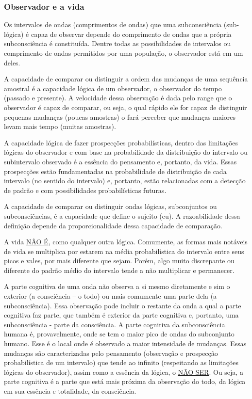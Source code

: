 \subsubsection{Observador e a vida}
Os intervalos de ondas (comprimentos de ondas) que uma subconsciência (sub-lógica) é capaz de observar depende do comprimento de ondas que a própria subconsciência é constituída. Dentre todas as possibilidades de intervalos ou comprimento de ondas permitidos por uma população, o observador está em um deles.

A capacidade de comparar ou distinguir a ordem das mudanças de uma sequência amostral é a capacidade lógica de um observador, o observador do tempo (passado e presente). A velocidade dessa observação é dada pelo range que o observador é capaz de comparar, ou seja, o qual rápido ele for capaz de distinguir pequenas mudanças (poucas amostras) o fará perceber que mudanças maiores levam mais tempo (muitas amostras). 

A capacidade lógica de fazer prospecções probabilísticas, dentro das limitações lógicas do observador e com base na probabilidade da distribuição do intervalo ou subintervalo observado é a essência do pensamento e, portanto, da vida. Essas prospecções estão fundamentadas na probabilidade de distribuição de cada intervalo (no sentido do intervalo) e, portanto, estão relacionadas com a detecção de padrão e com possibilidades probabilísticas futuras.

A capacidade de comparar ou distinguir ondas lógicas, subconjuntos ou subconsciências, é a capacidade que define o sujeito (eu). A razoabilidade dessa definição depende da proporcionalidade dessa capacidade de comparação.

A vida \underline{NÃO É}, como qualquer outra lógica. Comumente, as formas mais notáveis de vida se multiplica por estarem na média probabilística do intervalo entre seus picos e vales, por mais diferente que sejam. Porém, algo muito discrepante ou diferente do padrão médio do intervalo tende a não multiplicar e permanecer.

A parte cognitiva de uma onda não observa a si mesmo diretamente e sim o exterior (a consciência – o todo) ou mais comumente uma parte dela (a subconsciência). Essa observação pode incluir o restante da onda a qual a parte cognitiva faz parte, que também é exterior da parte cognitiva e, portanto, uma subconsciência - parte da consciência. A parte cognitiva da subconsciência humana é, provavelmente, onde se tem o maior pico de ondas do subconjunto humano. Esse é o local onde é observado a maior intensidade de mudanças. Essas mudanças são caracterizadas pelo pensamento (observação e prospecção probabilística de um intervalo) que tende ao infinito (respeitando as limitações lógicas do observador), assim como a essência da lógica, o \underline{NÃO SER}. Ou seja, a parte cognitiva é a parte que está mais próxima da observação do todo, da lógica em sua essência e totalidade, da consciência.

